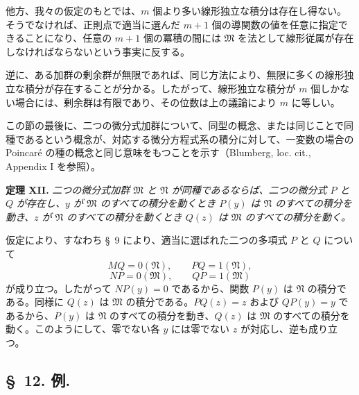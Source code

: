 \documentclass[11pt]{article}
\begin{document}
他方、我々の仮定のもとでは、$m$ 個より多い線形独立な積分は存在し得ない。そうでなければ、正則点で適当に選んだ $m+1$ 個の導関数の値を任意に指定できることになり、任意の $m+1$ 個の冪積の間には $\mathfrak M$ を法として線形従属が存在しなければならないという事実に反する。

逆に、ある加群の剰余群が無限であれば、同じ方法により、無限に多くの線形独立な積分が存在することが分かる。したがって、線形独立な積分が $m$ 個しかない場合には、剰余群は有限であり、その位数は上の議論により $m$ に等しい。

この節の最後に、二つの微分式加群について、同型の概念、または同じことで同種であるという概念が、対応する微分方程式系の積分に対して、一変数の場合の Poincaré の種の概念と同じ意味をもつことを示す（Blumberg, loc. cit., Appendix I を参照）。

\textbf{定理 XII.} \emph{二つの微分式加群 $\mathfrak M$ と $\mathfrak N$ が同種であるならば、二つの微分式 $P$ と $Q$ が存在し、$y$ が $\mathfrak M$ のすべての積分を動くとき $P(y)$ は $\mathfrak N$ のすべての積分を動き、$z$ が $\mathfrak N$ のすべての積分を動くとき $Q(z)$ は $\mathfrak M$ のすべての積分を動く。}

仮定により、すなわち \S~9 により、適当に選ばれた二つの多項式 $P$ と $Q$ について
\[
 MQ=0(\mathfrak N),
 \qquad
 PQ=1(\mathfrak N),
\]
\[
 NP=0(\mathfrak M),
 \qquad
 QP=1(\mathfrak M)
\]
が成り立つ。したがって $NP(y)=0$ であるから、関数 $P(y)$ は $\mathfrak N$ の積分である。同様に $Q(z)$ は $\mathfrak M$ の積分である。$PQ(z)=z$ および $QP(y)=y$ であるから、$P(y)$ は $\mathfrak N$ のすべての積分を動き、$Q(z)$ は $\mathfrak M$ のすべての積分を動く。このようにして、零でない各 $y$ には零でない $z$ が対応し、逆も成り立つ。

\subsection*{\S~12. 例.}
\end{document}
